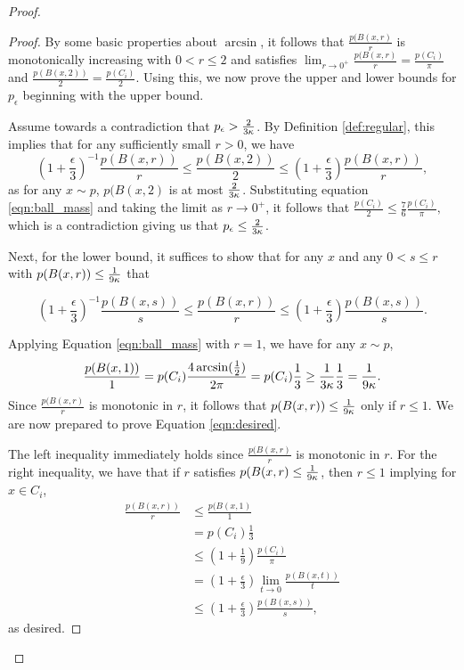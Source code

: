 \begin{proof}
\begin{proof}
By some basic properties about $\arcsin$, it follows that $\frac{p(B(x, r)}{r}$ is monotonically increasing with $0 < r \leq 2$ and satisfies $\lim_{r \to 0^+} \frac{p(B(x, r)}{r} = \frac{p(C_i)}{\pi}$ and $\frac{p(B(x, 2))}{2} = \frac{p(C_i)}{2}$. Using this, we now prove the upper and lower bounds for $p_\epsilon$ beginning with the upper bound.

Assume towards a contradiction that $p_\epsilon > \frac{2}{3\kappa}$. By Definition \ref{def:regular}, this implies that for any sufficiently small $r > 0$, we have $$\left(1+ \frac{\epsilon}{3} \right)^{-1}\frac{p(B(x, r))}{r} \leq \frac{p(B(x, 2))}{2} \leq \left(1+ \frac{\epsilon}{3}\right)\frac{p(B(x, r))}{r},$$ as for any $x \sim p$, $p(B(x, 2)$ is at most $\frac{2}{3\kappa}$. Substituting equation \ref{eqn:ball_mass} and taking the limit as $r \to 0^+$, it follows that $\frac{p(C_i)}{2} \leq \frac{7}{6}\frac{p(C_i)}{\pi},$ which is a contradiction giving us that $p_\epsilon \leq \frac{2}{3\kappa}$.

Next, for the lower bound, it suffices to show that for any $x$ and any $0 < s \leq r$ with $p(B(x, r)) \leq \frac{1}{9\kappa}$ that 

\begin{equation}\label{eqn:desired}
\left(1+ \frac{\epsilon}{3} \right)^{-1}\frac{p(B(x, s))}{s} \leq \frac{p(B(x, r))}{r} \leq \left(1+ \frac{\epsilon}{3} \right)\frac{p(B(x, s))}{s}.
\end{equation}

Applying Equation \ref{eqn:ball_mass} with $r = 1$, we have for any $x \sim p$,
\begin{equation*}
\frac{p(B(x, 1))}{1} = p(C_i)\frac{4 \arcsin(\frac{1}{2})}{2\pi} = p(C_i)\frac{1}{3} \geq \frac{1}{3\kappa}\frac{1}{3} = \frac{1}{9\kappa}.
\end{equation*}
Since $\frac{p(B(x, r)}{r}$ is monotonic in $r$, it follows that $p(B(x, r)) \leq \frac{1}{9\kappa}$ only if $r \leq 1$. We are now prepared to prove Equation \ref{eqn:desired}.

The left inequality immediately holds since $\frac{p(B(x, r)}{r}$ is monotonic in $r$. For the right inequality, we have that if $r$ satisfies $p(B(x, r) \leq \frac{1}{9\kappa}$, then $r \leq 1$ implying for $x \in C_i$,
\begin{equation*}
\begin{split}
\frac{p(B(x, r))}{r} &\leq \frac{p(B(x, 1)}{1} \\
&= p(C_i)\frac{1}{3} \\
&\leq (1 + \frac{1}{9})\frac{p(C_i)}{\pi} \\
&= \left(1 + \frac{\epsilon}{3} \right)\lim_{t \to 0} \frac{p(B(x, t))}{t} \\
&\leq \left(1 + \frac{\epsilon}{3} \right)\frac{p(B(x, s))}{s},
\end{split}
\end{equation*}
as desired. 
\end{proof}


\end{proof}
